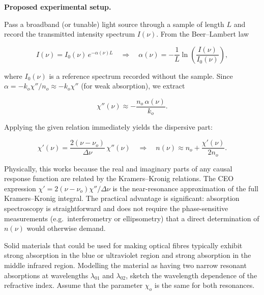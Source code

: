 \textbf{Proposed experimental setup.}

Pass a broadband (or tunable) light source through a sample of length $L$ and record the transmitted intensity spectrum $I(\nu)$. From the Beer--Lambert law

\begin{equation*}
  I(\nu) = I_0(\nu)\,e^{-\alpha(\nu)L}
  \quad\Longrightarrow\quad
  \alpha(\nu) = -\frac{1}{L}\ln\!\left(\frac{I(\nu)}{I_0(\nu)}\right),
\end{equation*}

where $I_0(\nu)$ is a reference spectrum recorded without the sample. Since $\alpha = -k_o\chi''/n_o \approx -k_o\chi''$ (for weak absorption), we extract

\begin{equation*}
  \chi''(\nu) \approx -\frac{n_o\,\alpha(\nu)}{k_o}.
\end{equation*}

Applying the given relation immediately yields the dispersive part:

\begin{equation*}
  \boxed{\chi'(\nu) = \frac{2(\nu-\nu_o)}{\Delta\nu}\,\chi''(\nu)}
  \quad\Longrightarrow\quad
  n(\nu) \approx n_o + \frac{\chi'(\nu)}{2n_o}.
\end{equation*}

Physically, this works because the real and imaginary parts of any causal response function are related by the Kramers--Kronig relations. The CEO expression $\chi' = 2(\nu-\nu_o)\chi''/\Delta\nu$ is the near-resonance approximation of the full Kramers--Kronig integral. The practical advantage is significant: absorption spectroscopy is straightforward and does not require the phase-sensitive measurements (e.g.\ interferometry or ellipsometry) that a direct determination of $n(\nu)$ would otherwise demand.


\begin{question}[Question 4]Solid materials that could be used for making optical fibres typically
exhibit strong absorption in the blue or ultraviolet region and strong absorption in the middle
infrared region. Modelling the material as having two narrow resonant absorptions at wavelengths
$\lambda_{01}$ and $\lambda_{02}$, sketch the wavelength dependence of the refractive index.
Assume that the parameter $\chi_{o}$ is the same for both resonances.
\end{question}

